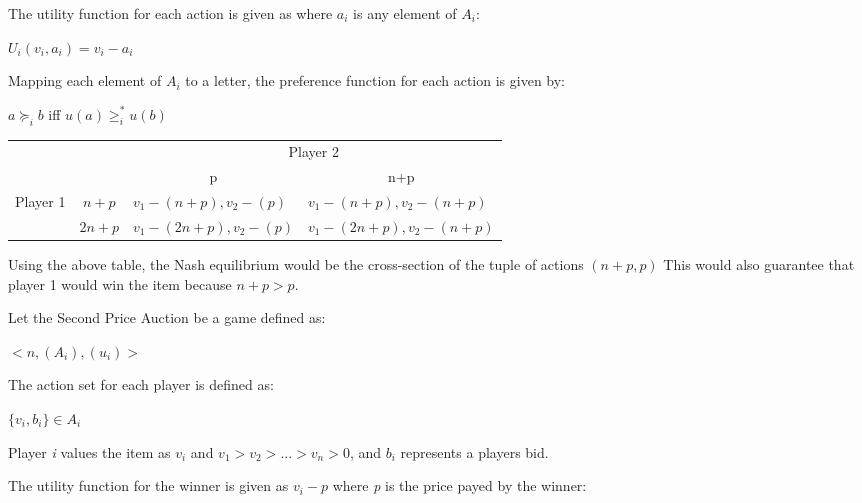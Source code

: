 \documentclass{homework}
\begin{document}
The utility function for each action is given as where $a_{i}$ is any element of $A_{i}$:

\indent\hspace{18pt}$U_{i}(v_{i}, a_{i}) = v_{i} - a_{i}$

Mapping each element of $A_{i}$ to a letter, the preference function for each action is given by:

$a \succcurlyeq_{i} b$ iff $u(a) \geq_{i}^\ast u(b)$

\begin{table}[h]
\begin{tabular}{llll}
                                           	&                       	& \multicolumn{2}{c}{Player 2}                                                                                  	\\ \cline{3-4}
                                           	& \multicolumn{1}{l|}{} 	& \multicolumn{1}{c|}{p}                             	& \multicolumn{1}{c|}{n+p}                             	\\ \cline{2-4}
\multicolumn{1}{c|}{\multirow{2}{*}{Player 1}} & \multicolumn{1}{c|}{$n+p$}  & \multicolumn{1}{l|}{$v_{1} - (n+p), v_{2} - (p)$}  & \multicolumn{1}{l|}{$v_{1} - (n+p), v_{2} - (n+p)$}  \\ \cline{2-4}
\multicolumn{1}{c|}{}                      	& \multicolumn{1}{c|}{$2n+p$} & \multicolumn{1}{l|}{$v_{1} - (2n+p), v_{2} - (p)$} & \multicolumn{1}{l|}{$v_{1} - (2n+p), v_{2} - (n+p)$} \\ \cline{2-4}
\end{tabular}
\end{table}

Using the above table, the Nash equilibrium would be the cross-section of the tuple of actions $(n + p, p)$ This would also guarantee that player 1 would win the item because $n + p > p$.

\exercise[18.3]
Let the Second Price Auction be a game defined as:

\indent\hspace{18pt}$<n,(A_{i}),(u_{i})>$

The action set for each player is defined as:

\indent\hspace{18pt}${\{v_{i}, b_{i}\}} \in A_{i}$


Player \emph{i} values the item as $v_{i}$ and $v_{1} > v_{2} > ... > v_{n} > 0$, and $b_{i}$ represents a players bid.

The utility function for the winner is given as $v_{i} - p$ where \emph{p} is the price payed by the winner:
\end{document}

